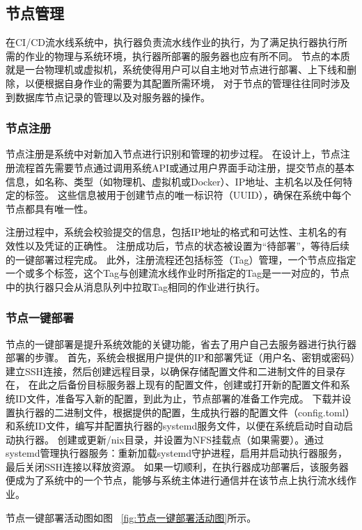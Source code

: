 \subsection{节点管理}
在CI/CD流水线系统中，执行器负责流水线作业的执行，为了满足执行器执行所需的作业的物理与系统环境，执行器所部署的服务器也应有所不同。
节点的本质就是一台物理机或虚拟机，系统使得用户可以自主地对节点进行部署、上下线和删除，以便根据自身作业的需要为其配置所需环境，
对于节点的管理往往同时涉及到数据库节点记录的管理以及对服务器的操作。

\subsubsection{节点注册}
节点注册是系统中对新加入节点进行识别和管理的初步过程。
在设计上，节点注册流程首先需要节点通过调用系统API或通过用户界面手动注册，提交节点的基本信息，如名称、类型（如物理机、虚拟机或Docker）、IP地址、主机名以及任何特定的标签。
这些信息被用于创建节点的唯一标识符（UUID），确保在系统中每个节点都具有唯一性。

注册过程中，系统会校验提交的信息，包括IP地址的格式和可达性、主机名的有效性以及凭证的正确性。
注册成功后，节点的状态被设置为“待部署”，等待后续的一键部署过程完成。
此外，注册流程还包括标签（Tag）管理，一个节点应指定一个或多个标签，这个Tag与创建流水线作业时所指定的Tag是一一对应的，节点中的执行器只会从消息队列中拉取Tag相同的作业进行执行。

\subsubsection{节点一键部署}

节点的一键部署是提升系统效能的关键功能，省去了用户自己去服务器进行执行器部署的步骤。
首先，系统会根据用户提供的IP和部署凭证（用户名、密钥或密码）建立SSH连接，然后创建远程目录，以确保存储配置文件和二进制文件的目录存在，
在此之后备份目标服务器上现有的配置文件，创建或打开新的配置文件和系统ID文件，准备写入新的配置，到此为止，节点部署的准备工作完成。
下载并设置执行器的二进制文件，根据提供的配置，生成执行器的配置文件（config.toml）和系统ID文件，编写并配置执行器的systemd服务文件，以便在系统启动时自动启动执行器。
创建或更新/nix目录，并设置为NFS挂载点（如果需要）。通过systemd管理执行器服务：重新加载systemd守护进程，启用并启动执行器服务，最后关闭SSH连接以释放资源。
如果一切顺利，在执行器成功部署后，该服务器便成为了系统中的一个节点，能够与系统主体进行通信并在该节点上执行流水线作业。

节点一键部署活动图如图~ \ref{fig:节点一键部署活动图}所示。

